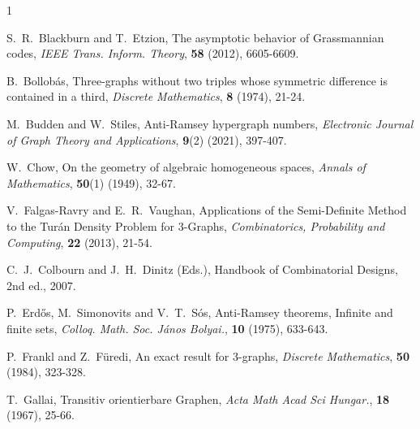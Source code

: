 \documentclass[10pt,a4paper]{article}
\theoremstyle{definition}
\begin{document}
\begin{thebibliography}{1}


     S.~R.~Blackburn and T.~Etzion, The asymptotic behavior of Grassmannian codes, {\em IEEE Trans. Inform. Theory}, {\bf 58} (2012), 6605-6609.

     B.~Bollob\'as, Three-graphs without two triples whose symmetric difference is contained in a third, {\em Discrete Mathematics}, {\bf 8} (1974), 21-24.

     M.~Budden and W.~Stiles, Anti-Ramsey hypergraph numbers, {\em Electronic Journal of Graph Theory and Applications}, {\bf 9}(2) (2021), 397-407.

     W.~Chow, On the geometry of algebraic homogeneous spaces, {\em Annals of Mathematics}, {\bf 50}(1) (1949), 32-67.

     V.~Falgas-Ravry and E.~R.~Vaughan, Applications of the Semi-Definite Method to the Tur\'an Density Problem for $3$-Graphs, {\em Combinatorics, Probability and Computing}, {\bf 22} (2013), 21-54.

     C.~J.~Colbourn and J.~H.~Dinitz (Eds.), Handbook of Combinatorial Designs, 2nd ed., 2007.

      P.~Erd\H{o}s, M.~Simonovits and V.~T.~S\'os, Anti-Ramsey theorems, Infinite and finite sets, {\em Colloq. Math. Soc. J\'anos Bolyai.}, {\bf 10} (1975), 633-643.

     P.~Frankl and Z.~F\"uredi, An exact result for 3-graphs, {\em Discrete Mathematics}, {\bf 50} (1984), 323-328.




     T.~Gallai, Transitiv orientierbare Graphen, {\em Acta Math Acad Sci Hungar.}, {\bf 18} (1967), 25-66.


\end{thebibliography}
\end{document}
